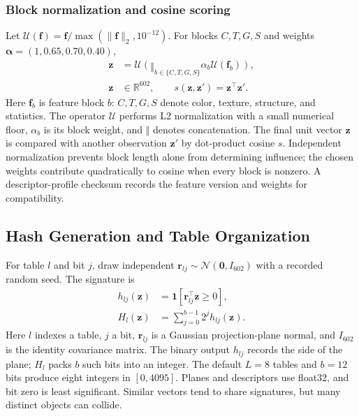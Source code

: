 \documentclass[conference]{IEEEtran}
\begin{document}
\subsubsection{Block normalization and cosine scoring}
Let $\mathcal U(\mathbf f)=\mathbf f/\max(\|\mathbf f\|_2,10^{-12})$. For blocks $C,T,G,S$ and weights $\boldsymbol\alpha=(1,0.65,0.70,0.40)$,
\begin{equation}
\begin{aligned}
\mathbf z&=\mathcal U\left(\mathop{\Vert}_{b\in\{C,T,G,S\}}
\alpha_b\mathcal U(\mathbf f_b)\right),\\
\mathbf z&\in\mathbb R^{602},\qquad s(\mathbf z,\mathbf z')=\mathbf z^\top\mathbf z'.
\end{aligned}
\label{eq:embedding}
\end{equation}
Here $\mathbf f_b$ is feature block $b$: $C,T,G,S$ denote color, texture, structure, and statistics. The operator $\mathcal U$ performs L2 normalization with a small numerical floor, $\alpha_b$ is its block weight, and $\Vert$ denotes concatenation. The final unit vector $\mathbf z$ is compared with another observation $\mathbf z'$ by dot-product cosine $s$. Independent normalization prevents block length alone from determining influence; the chosen weights contribute quadratically to cosine when every block is nonzero. A descriptor-profile checksum records the feature version and weights for compatibility.

\subsection{Hash Generation and Table Organization}
For table $l$ and bit $j$, draw independent $\mathbf r_{lj}\sim\mathcal N(\mathbf0,I_{602})$ with a recorded random seed. The signature is
\begin{equation}
\begin{aligned}
h_{lj}(\mathbf z)&=\mathbf1[\mathbf r_{lj}^\top\mathbf z\ge0],\\
H_l(\mathbf z)&=\sum_{j=0}^{b-1}2^jh_{lj}(\mathbf z).
\end{aligned}
\end{equation}
Here $l$ indexes a table, $j$ a bit, $\mathbf r_{lj}$ is a Gaussian projection-plane normal, and $I_{602}$ is the identity covariance matrix. The binary output $h_{lj}$ records the side of the plane; $H_l$ packs $b$ such bits into an integer. The default $L=8$ tables and $b=12$ bits produce eight integers in $[0,4095]$. Planes and descriptors use float32, and bit zero is least significant. Similar vectors tend to share signatures, but many distinct objects can collide.
\end{document}
